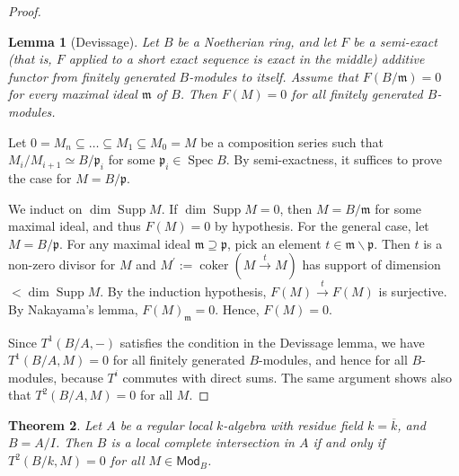 \documentclass{article}
\newtheorem{theorem}{Theorem}[section]
\newtheorem{lemma}[theorem]{Lemma}
\theoremstyle{definition}
\newcommand{\Spec}{\operatorname{Spec}}
\newcommand{\coker}{\operatorname{coker}}
\newcommand{\supp}{\operatorname{Supp}}
\begin{document}
\begin{proof}
\begin{lemma}[Devissage]
Let \(B\) be a Noetherian ring, and let \(F\) be a semi-exact (that is, \(F\) applied to a short exact sequence is exact in the middle) additive functor from finitely generated \(B\)-modules to itself. Assume that \(F(B / \mathfrak{m}) = 0\) for every maximal ideal \(\mathfrak{m}\) of \(B\). Then \(F(M) = 0\) for all finitely generated \(B\)-modules.
\end{lemma}
\begin{subproof}
Let \(0 = M_{n}\subseteq \dots \subseteq M_{1}\subseteq M_{0} = M\) be a composition series such that \(M_{i} / M_{i+1}\simeq B / \mathfrak{p}_{i}\) for some \(\mathfrak{p}_{i}\in \Spec B\). By semi-exactness, it suffices to prove the case for \(M = B / \mathfrak{p}\).

We induct on \(\dim \supp M\). If \(\dim \supp M = 0\), then \(M = B / \mathfrak{m}\) for some maximal ideal, and thus \(F(M) = 0\) by hypothesis. For the general case, let \(M = B / \mathfrak{p}\). For any maximal ideal \(\mathfrak{m}\supseteq \mathfrak{p}\), pick an element \(t\in \mathfrak{m}\backslash \mathfrak{p}\). Then \(t\) is a non-zero divisor for \(M\) and \(M^{\prime}:= \coker(M\stackrel{t}{\longrightarrow}M)\) has support of dimension \(< \dim \supp M\). By the induction hypothesis, \(F(M)\stackrel{t}{\longrightarrow}F(M)\) is surjective. By Nakayama's lemma, \(F(M)_{\mathfrak{m}} = 0\). Hence, \(F(M) = 0\).
\end{subproof}

Since \(T^{1}(B / A, - )\) satisfies the condition in the Devissage lemma, we have \(T^{1}(B / A,M) = 0\) for all finitely generated \(B\)-modules, and hence for all \(B\)-modules, because \(T^{i}\) commutes with direct sums. The same argument shows also that \(T^{2}(B / A,M) = 0\) for all \(M\).
\end{proof}

\begin{theorem}
Let \(A\) be a regular local \(k\)-algebra with residue field \(k = \overline{k}\), and \(B = A / I\). Then \(B\) is a local complete intersection in \(A\) if and only if \(T^{2}(B / k,M) = 0\) for all \(M\in \mathsf{Mod}_{B}\).
\end{theorem}
\end{document}
